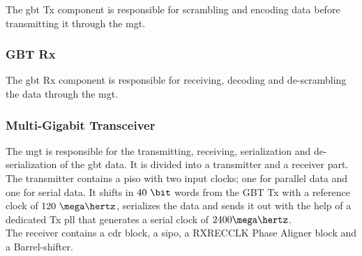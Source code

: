 \documentclass[main.tex]{subfiles}
\begin{document}
The \gls{gbt} Tx component is responsible for scrambling and encoding data before transmitting it through the \gls{mgt}.

\subsubsection{GBT Rx}

The \gls{gbt} Rx component is responsible for receiving, decoding and de-scrambling the data through the \gls{mgt}.

\subsubsection{Multi-Gigabit Transceiver}
The \gls{mgt} is responsible for the transmitting, receiving, serialization and de-serialization of the \gls{gbt} data. It is divided into a transmitter and a receiver part.\\ The transmitter contains a \gls{piso} with two input clocks; one for parallel data and one for serial data. It shifts in $40~\bit$ words from the GBT Tx with a reference clock of $120~\mega\hertz$, serializes the data and sends it out with the help of a dedicated Tx \gls{pll} that generates a serial clock of $2400 \mega\hertz$.\\ The receiver contains a \gls{cdr} block, a \gls{sipo}, a RXRECCLK Phase Aligner block and a Barrel-shifter. 



\end{document}

